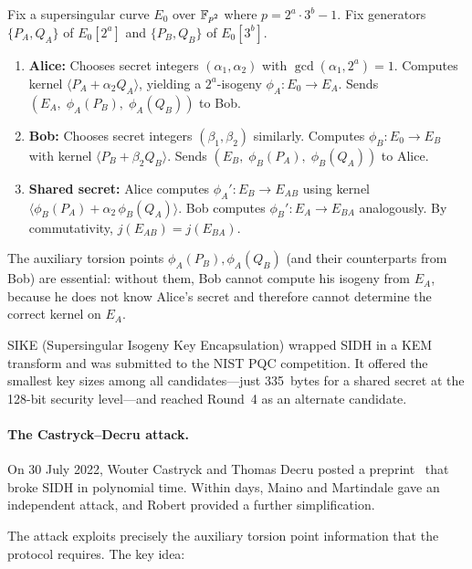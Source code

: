 \begin{definition}
\label{def:sidh}
Fix a supersingular curve $E_0$ over $\mathbb{F}_{p^2}$ where $p = 2^a \cdot 3^b - 1$.  Fix generators $\{P_A, Q_A\}$ of $E_0[2^a]$ and $\{P_B, Q_B\}$ of $E_0[3^b]$.
\begin{enumerate}
\item \textbf{Alice:} Chooses secret integers $(\alpha_1,\alpha_2)$ with $\gcd(\alpha_1, 2^a) = 1$.  Computes kernel $\langle P_A + \alpha_2 Q_A \rangle$, yielding a $2^a$-isogeny $\phi_A\colon E_0 \to E_A$.  Sends $(E_A,\; \phi_A(P_B),\; \phi_A(Q_B))$ to Bob.
\item \textbf{Bob:} Chooses secret integers $(\beta_1,\beta_2)$ similarly.  Computes $\phi_B\colon E_0 \to E_B$ with kernel $\langle P_B + \beta_2 Q_B \rangle$.  Sends $(E_B,\; \phi_B(P_A),\; \phi_B(Q_A))$ to Alice.
\item \textbf{Shared secret:} Alice computes $\phi_A'\colon E_B \to E_{AB}$ using kernel $\langle \phi_B(P_A) + \alpha_2\,\phi_B(Q_A) \rangle$.  Bob computes $\phi_B'\colon E_A \to E_{BA}$ analogously.  By commutativity, $j(E_{AB}) = j(E_{BA})$.
\end{enumerate}
\end{definition}

The auxiliary torsion points $\phi_A(P_B), \phi_A(Q_B)$ (and their counterparts from Bob) are essential: without them, Bob cannot compute his isogeny from $E_A$, because he does not know Alice's secret and therefore cannot determine the correct kernel on $E_A$.

SIKE (Supersingular Isogeny Key Encapsulation) wrapped SIDH in a KEM transform and was submitted to the NIST PQC competition.  It offered the smallest key sizes among all candidates---just 335~bytes for a shared secret at the 128-bit security level---and reached Round~4 as an alternate candidate.

\paragraph{The Castryck--Decru attack.}
On 30 July 2022, Wouter Castryck and Thomas Decru posted a preprint~\cite{CastryckDecru2023} that broke SIDH in polynomial time.  Within days, Maino and Martindale gave an independent attack, and Robert provided a further simplification.

The attack exploits precisely the auxiliary torsion point information that the protocol requires.  The key idea:


